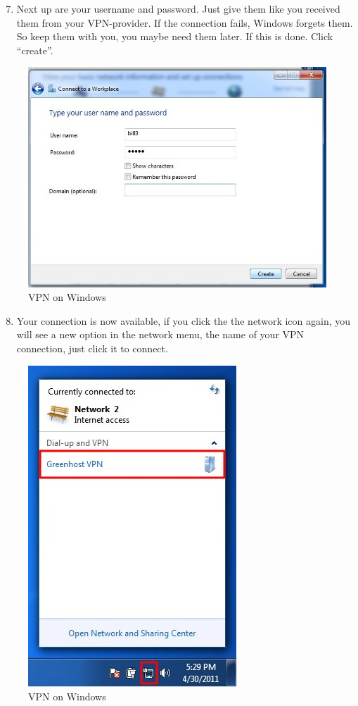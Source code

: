 \begin{enumerate}[1.]
\setcounter{enumi}{6}
\item
  Next up are your username and password. Just give them like you
  received them from your VPN-provider. If the connection fails, Windows
  forgets them. So keep them with you, you maybe need them later. If
  this is done. Click ``create''.
\end{enumerate}
\begin{figure}[htbp]
\centering
\includegraphics{vpn_windows_06.jpg}
\caption{VPN on Windows}
\end{figure}

\begin{enumerate}[1.]
\setcounter{enumi}{7}
\item
  Your connection is now available, if you click the the network icon
  again, you will see a new option in the network menu, the name of your
  VPN connection, just click it to connect.
\end{enumerate}
\begin{figure}[htbp]
\centering
\includegraphics{vpn_windows_07.jpg}
\caption{VPN on Windows}
\end{figure}

